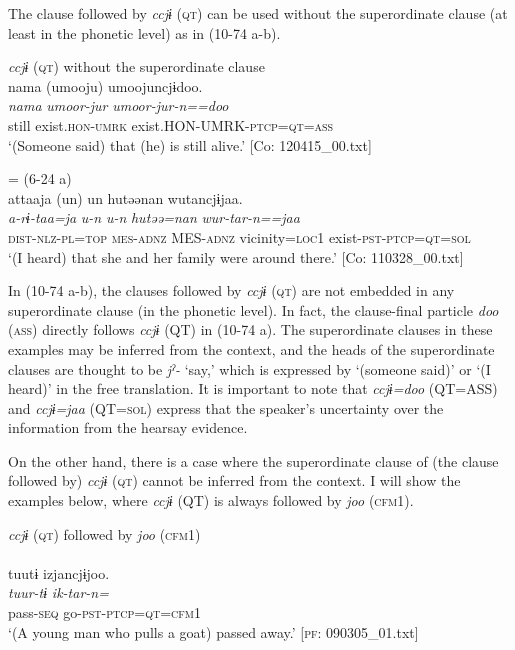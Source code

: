 The clause followed by \textit{ccjɨ} (\textsc{qt}) can be used without the superordinate clause (at least in the phonetic level) as in (10-74 a-b).

\ea\label{ex:10.74}   \textit{ccjɨ} (\textsc{qt}) without the superordinate clause\\
  \ea  %
      \glll    nama  (umooju)  umoojuncjɨdoo.\\
      \textit{nama}  \textit{umoor-jur}  \textit{umoor-jur-n==doo}\\
      still  exist.\textsc{hon}-\textsc{umrk}  exist.HON-UMRK-\textsc{ptcp}=\textsc{qt}=\textsc{ass}\\
      \glt       ‘(Someone said) that (he) is still alive.’ [Co: 120415\_00.txt]

  \ex{} = (6-24 a)\\
      \glll    attaaja  (un)  un  hutəənan   wutancjɨjaa.\\
      \textit{a-rɨ-taa=ja}  \textit{u-n}  \textit{u-n}  \textit{hutəə=nan} \textit{wur-tar-n==jaa}\\
      \textsc{dist}-\textsc{nlz}-\textsc{pl}=\textsc{top}  \textsc{mes}-\textsc{adnz}  MES-\textsc{adnz}  vicinity=\textsc{loc}1 exist-\textsc{pst}-\textsc{ptcp}=\textsc{qt}=\textsc{sol}\\
      \glt       ‘(I heard) that she and her family were around there.’ [Co: 110328\_00.txt]
    \z
\z

In (10-74 a-b), the clauses followed by \textit{ccjɨ} (\textsc{qt}) are not embedded in any superordinate clause (in the phonetic level). In fact, the clause-final particle \textit{doo} (\textsc{ass}) directly follows \textit{ccjɨ} (QT) in (10-74 a). The superordinate clauses in these examples may be inferred from the context, and the heads of the superordinate clauses are thought to be \textit{jˀ-} ‘say,’ which is expressed by ‘(someone said)’ or ‘(I heard)’ in the free translation. It is important to note that \textit{ccjɨ=doo} (QT=ASS) and \textit{ccjɨ=jaa} (QT=\textsc{sol}) express that the speaker’s uncertainty over the information from the hearsay evidence.

  On the other hand, there is a case where the superordinate clause of (the clause followed by) \textit{ccjɨ} (\textsc{qt}) cannot be inferred from the context. I will show the examples below, where \textit{ccjɨ} (QT) is always followed by \textit{joo} (\textsc{cfm}1).

\ea\label{ex:10.75}   \textit{ccjɨ} (\textsc{qt}) followed by \textit{joo} (\textsc{cfm}1)\\
  \ea{}\\
      \glll    tuutɨ  izjancjɨjoo.\\
      \textit{tuur-tɨ}  \textit{ik-tar-n=}\\
      pass-\textsc{seq}  go-\textsc{pst}-\textsc{ptcp}=\textsc{qt}=\textsc{cfm}1\\
      \glt       ‘(A young man who pulls a goat) passed away.’ [\textsc{pf}: 090305\_01.txt]

